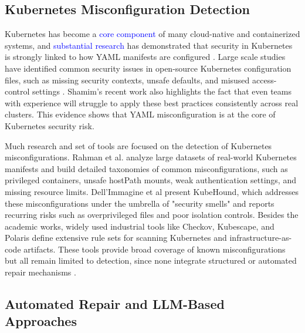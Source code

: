 \documentclass[preprint,12pt]{elsarticle}
\newcommand{\new}[1]{\textcolor{blue}{#1}}
\begin{document}
\subsection{Kubernetes Misconfiguration Detection}



Kubernetes has become a \new{core component} of many cloud-native and containerized systems, and \new{substantial research} has demonstrated that security in Kubernetes is strongly linked to how YAML manifests are configured \cite{kamieniarz2024comparative, rahman2023k8s}. Large scale studies have identified common security issues in open-source Kubernetes configuration files, such as missing security contexts, unsafe defaults, and misused access-control settings \cite{rahman2023k8s, dellimmagine2023kubehound}. Shamim’s recent work \cite{shamim2024technoeducational} also highlights the fact that even teams with experience will struggle to apply these best practices consistently across real clusters. This evidence shows that YAML misconfiguration is at the core of Kubernetes security risk.

Much research and set of tools are focused on the detection of Kubernetes misconfigurations. Rahman et al. \cite{rahman2023k8s} analyze large datasets of real-world Kubernetes manifests and build detailed taxonomies of common misconfigurations, such as privileged containers, unsafe hostPath mounts, weak authentication settings, and missing resource limits. Dell’Immagine et al \cite{dellimmagine2023kubehound} present KubeHound, which addresses these misconfigurations under the umbrella of  "security smells" and reports recurring risks such as overprivileged files and poor isolation controls. Besides the academic works, widely used industrial tools like Checkov, Kubescape, and Polaris define extensive rule sets for scanning Kubernetes and infrastructure-as-code artifacts. These tools provide broad coverage of known misconfigurations but all remain limited to detection, since none integrate structured or automated repair mechanisms \cite{checkovtool, kubescapetool, polaristool}.

\subsection{Automated Repair and LLM-Based Approaches}
\end{document}
